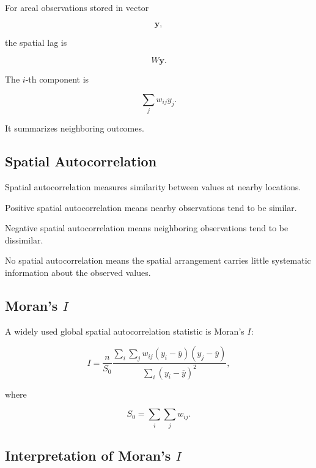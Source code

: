 For areal observations stored in vector

\[
\mathbf{y},
\]

the spatial lag is

\[
\boxed{
W\mathbf{y}.
}
\]

The \(i\)-th component is

\[
\boxed{
\sum_j
w_{ij}y_j.
}
\]

It summarizes neighboring outcomes.

\subsection{Spatial Autocorrelation}
\label{subsec:spatial-autocorrelation}

Spatial autocorrelation measures similarity between values at nearby
locations.

Positive spatial autocorrelation means nearby observations tend to be
similar.

Negative spatial autocorrelation means neighboring observations tend to
be dissimilar.

No spatial autocorrelation means the spatial arrangement carries little
systematic information about the observed values.

\subsection{Moran's \(I\)}
\label{subsec:morans-i}

A widely used global spatial autocorrelation statistic is Moran's \(I\):

\[
\boxed{
I
=
\frac{
n
}{
S_0
}
\frac{
\displaystyle
\sum_i
\sum_j
w_{ij}
(
y_i-\overline{y}
)
(
y_j-\overline{y}
)
}{
\displaystyle
\sum_i
(
y_i-\overline{y}
)^2
},
}
\]

where

\[
\boxed{
S_0
=
\sum_i
\sum_j
w_{ij}.
}
\]

\subsection{Interpretation of Moran's \(I\)}
\label{subsec:morans-i-interpretation}

